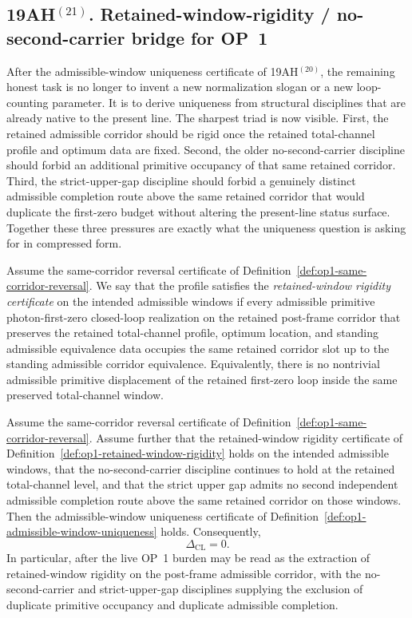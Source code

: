 \subsection*{19AH$^{(21)}$. Retained-window-rigidity / no-second-carrier bridge for OP~1}
After the admissible-window uniqueness certificate of 19AH$^{(20)}$, the remaining honest task is no longer to invent a new normalization slogan or a new loop-counting parameter. It is to derive uniqueness from structural disciplines that are already native to the present line. The sharpest triad is now visible. First, the retained admissible corridor should be rigid once the retained total-channel profile and optimum data are fixed. Second, the older no-second-carrier discipline should forbid an additional primitive occupancy of that same retained corridor. Third, the strict-upper-gap discipline should forbid a genuinely distinct admissible completion route above the same retained corridor that would duplicate the first-zero budget without altering the present-line status surface. Together these three pressures are exactly what the uniqueness question is asking for in compressed form.

\begin{definition}
\label{def:op1-retained-window-rigidity}
Assume the same-corridor reversal certificate of Definition~\ref{def:op1-same-corridor-reversal}. We say that the profile satisfies the \emph{retained-window rigidity certificate} on the intended admissible windows if every admissible primitive photon-first-zero closed-loop realization on the retained post-frame corridor that preserves the retained total-channel profile, optimum location, and standing admissible equivalence data occupies the same retained corridor slot up to the standing admissible corridor equivalence. Equivalently, there is no nontrivial admissible primitive displacement of the retained first-zero loop inside the same preserved total-channel window.
\end{definition}

\begin{proposition}
\label{prop:op1-rigidity-gap-uniqueness-bridge}
Assume the same-corridor reversal certificate of Definition~\ref{def:op1-same-corridor-reversal}. Assume further that the retained-window rigidity certificate of Definition~\ref{def:op1-retained-window-rigidity} holds on the intended admissible windows, that the no-second-carrier discipline continues to hold at the retained total-channel level, and that the strict upper gap admits no second independent admissible completion route above the same retained corridor on those windows. Then the admissible-window uniqueness certificate of Definition~\ref{def:op1-admissible-window-uniqueness} holds. Consequently,
\[
 \Delta_{\mathrm{CL}} = 0.
\]
In particular, after the live OP~1 burden may be read as the extraction of retained-window rigidity on the post-frame admissible corridor, with the no-second-carrier and strict-upper-gap disciplines supplying the exclusion of duplicate primitive occupancy and duplicate admissible completion.
\end{proposition}


